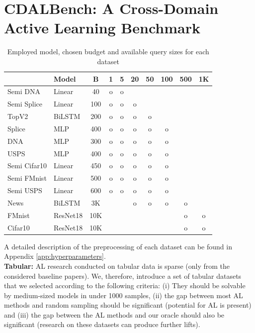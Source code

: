 \documentclass[]{article}
\begin{document}
\section{CDALBench: A Cross-Domain Active Learning Benchmark}\label{sec:datasets}
\begin{table}
	\vspace{-0.7cm}
	\caption{Employed model, chosen budget and available query sizes for each dataset}
	\vspace{0.1cm}
	\label{tab:batch_sizes}
	{\scriptsize
		\begin{tabular}{l|l|c|c|c|c|c|c|c|c}
			& Model  & B & 1 & 5 & 20 & 50 & 100 & 500 & 1K \\
			\hline
			Semi DNA    & Linear & 40 & o & o &&&&& \\
			Semi Splice & Linear & 100 & o & o & o &&&&\\
			TopV2       & BiLSTM & 200 & o & o & o & o &&& \\
			Splice      & MLP    & 400 & o & o & o & o & o && \\
			DNA         & MLP    & 300 & o & o & o & o & o && \\
			USPS        & MLP    & 400 & o & o & o & o & o && \\
			Semi Cifar10& Linear & 450 & o & o & o & o & o && \\
			Semi FMnist & Linear & 500 & o & o & o & o & o && \\
			Semi USPS   & Linear & 600 & o & o & o & o & o && \\
			News        & BiLSTM & 3K &&& o & o & o & o &\\
			FMnist      & ResNet18& 10K &&&&&& o & o\\
			Cifar10     & ResNet18& 10K &&&&&& o & o \\
		\end{tabular}
	}
	\vspace{-0.55cm}
\end{table}
A detailed description of the preprocessing of each dataset can be found in Appendix \ref{app:hyperparameters}. \\ [1mm]
\textbf{Tabular:}
AL research conducted on tabular data is sparse (only \cite{ashdeep} from the considered baseline papers). 
We, therefore, introduce a set of tabular datasets that we selected according to the following criteria:
(i) They should be solvable by medium-sized models in under 1000 samples, (ii) the gap between most AL methods and random sampling should be significant (potential for AL is present) and (iii) the gap between the AL methods and our oracle should also be significant (research on these datasets can produce further lifts).
\end{document}
